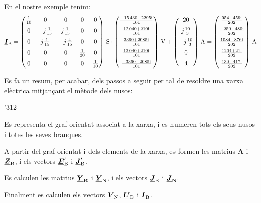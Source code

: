 \begin{list}{}
   En el nostre exemple tenim:
   \[
   \mcmplx{I}\ped{B} =
   \begin{pmatrix}
         \frac{1}{10} & 0 & 0 & 0 & 0 \\[2mm]
         0 & -j \frac{1}{15} & j \frac{1}{15} & 0 & 0 \\[2mm]
         0 & j \frac{1}{15} & -j \frac{4}{15} & 0 & 0 \\[2mm]
         0 & 0 & 0 & \frac{1}{20} & 0 \\[2mm]
         0 & 0 & 0 & 0 & \frac{1}{10}
   \end{pmatrix}\,\unit{S} \cdot
   \begin{pmatrix}
           \frac{\complexnum{ -15430 - j 2295}}{101} \\[2mm]
           \frac{\complexnum{12040 + j 210}}{101}  \\[2mm]
           \frac{\complexnum{3390 + j 2085}}{101} \\[2mm]
           \frac{\complexnum{ 12040 + j 210}}{101}  \\[2mm]
           \frac{\complexnum{ -3390 - j 2085}}{101}
      \end{pmatrix}\,\unit{V}
   + \begin{pmatrix}
         20 \\[2mm]
         j \frac{10}{3} \\[2mm]
         -j \frac{10}{3} \\[2mm]
         0 \\[2mm]
         4
      \end{pmatrix}\,\unit{A} =
     \begin{pmatrix}
      \frac{\complexnum{ 954 - j 459}}{202} \\[2mm]
      \frac{\complexnum{-250 - j 480}}{202}  \\[2mm]
      \frac{\complexnum{1084 - j 876}}{202} \\[2mm]
      \frac{\complexnum{1204 + j 21}}{202}  \\[2mm]
      \frac{\complexnum{130 - j 417}}{202}
   \end{pmatrix}\,\unit{A}
   \]

\end{list}

Es fa un resum, per acabar, dels passos a seguir per tal de resoldre una
xarxa elèctrica mitjançant el mètode dels nusos:
\begin{dingautolist}{'312}
   \item Es representa el graf orientat associat a la xarxa, i es numeren tots els seus nusos i totes les seves branques.
   \item A partir del graf orientat i dels elements de la xarxa, es formen les matrius $\boldsymbol{A}$ i $\underline{\boldsymbol{Z}}_\mathrm{B}$, i els vectors $\underline{\boldsymbol{E}}_\mathrm{B}'$ i $\underline{\boldsymbol{J}}_\mathrm{B}'$.
   \item Es calculen les matrius $\underline{\boldsymbol{Y}}_\mathrm{B}$ i $\underline{\boldsymbol{Y}}_\mathrm{N}$, i els vectors $\underline{\boldsymbol{J}}_\mathrm{B}$ i $\underline{\boldsymbol{J}}_\mathrm{N}$.
   \item Finalment es calculen els vectors $\underline{\boldsymbol{V}}_\mathrm{N}$, $\underline{\boldsymbol{U}}_\mathrm{B}$ i $\underline{\boldsymbol{I}}_\mathrm{B}$.
\end{dingautolist}



